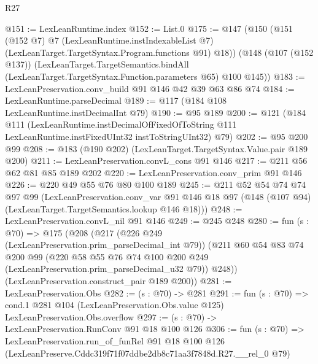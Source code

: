 \begin{lexlean}{R27}
\begin{coremodule}
@151 := LexLeanRuntime.index
@152 := List.{0}
@175 := @147
    (@150
      (@151
        (@152 @7)
        @7
        (LexLeanRuntime.instIndexableList @7)
        (LexLeanTarget.TargetSyntax.Program.functions @91)
        @18))
    (@148
      (@107 (@152 @137))
      (LexLeanTarget.TargetSemantics.bindAll
        (LexLeanTarget.TargetSyntax.Function.parameters @65)
        @100
        @145))
@183 := LexLeanPreservation.conv_build @91 @146 @42 @39 @63 @86 @74
@184 := LexLeanRuntime.parseDecimal
@189 := @117 (@184 @108 LexLeanRuntime.instDecimalInt @79)
@190 := @95 @189
@200 := @121
    (@184
      @111
      (LexLeanRuntime.instDecimalOfFixedOfToString
        @111
        LexLeanRuntime.instFixedUInt32
        instToStringUInt32)
      @79)
@202 := @95 @200 @99
@208 := @183 (@190 @202) (LexLeanTarget.TargetSyntax.Value.pair @189 @200)
@211 := LexLeanPreservation.convL_cons @91 @146
@217 := @211 @56 @62 @81 @85 @189 @202
@220 := LexLeanPreservation.conv_prim @91 @146
@226 := @220 @49 @55 @76 @80 @100 @189
@245 := @211
    @52
    @54
    @74
    @74
    @97
    @99
    (LexLeanPreservation.conv_var
      @91
      @146
      @18
      @97
      (@148 (@107 @94) (LexLeanTarget.TargetSemantics.lookup @146 @18)))
@248 := LexLeanPreservation.convL_nil @91 @146
@249 := @245 @248
@280 := fun (s : @70) =>
  @175
    (@208
      (@217
        (@226 @249 (LexLeanPreservation.prim_parseDecimal_int @79))
        (@211
          @60
          @54
          @83
          @74
          @200
          @99
          (@220 @58 @55 @76 @74 @100 @200 @249 (LexLeanPreservation.prim_parseDecimal_u32 @79))
          @248))
      (LexLeanPreservation.construct_pair @189 @200))
@281 := LexLeanPreservation.Obs
@282 := (s : @70) -> @281
@291 := fun (s : @70) =>
  cond.{1} @281 @104 (LexLeanPreservation.Obs.value @125) LexLeanPreservation.Obs.overflow
@297 := (s : @70) -> LexLeanPreservation.RunConv @91 @18 @100 @126
@306 := fun (s : @70) =>
  LexLeanPreservation.run_of_funRel
    @91
    @18
    @100
    @126
    (LexLeanPreserve.Cddc319f71f07ddbe2db8c71aa3f7848d.R27.__rel_0 @79)
\end{coremodule}
\end{lexlean}
